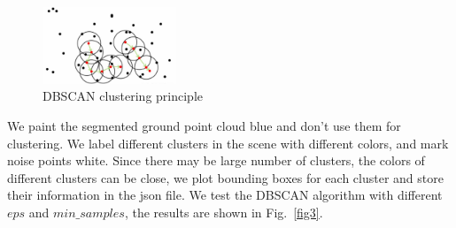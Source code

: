 \documentclass[10pt]{article}
\theoremstyle{nonumberplain}
\begin{document}
\begin{figure}[H]
	\centering
	\includegraphics[width=4cm]{fig2.png}
	\caption{DBSCAN clustering principle}
	\label{fig2}
\end{figure} 

We paint the segmented ground point cloud blue and don't use them for clustering. We label different clusters in the scene with different colors, and mark noise points white. Since there may be large number of clusters, the colors of different clusters can be close, we plot bounding boxes for each cluster and store their information in the json file. We test the DBSCAN algorithm with different $eps$ and $min\_samples$, the results are shown in Fig.~\ref{fig3}.
\end{document}
